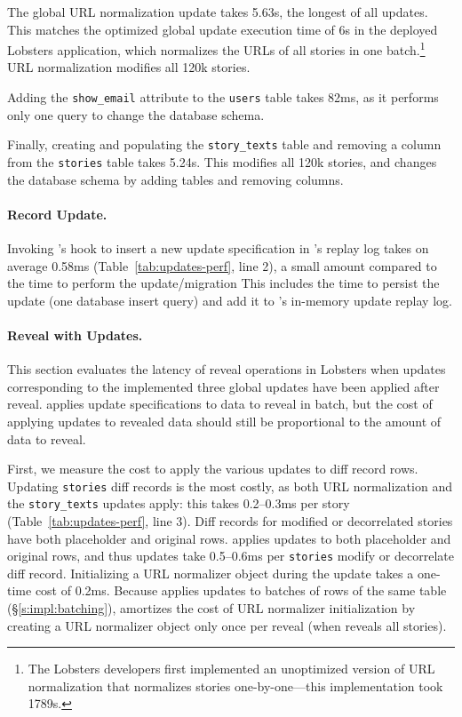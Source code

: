%
The global URL normalization update takes 5.63s, the longest of all
updates.
%
This matches the optimized global update execution time of 6s in the deployed
Lobsters application, which normalizes the URLs of all stories in one
batch.\footnote{The Lobsters developers first implemented an unoptimized version
of URL normalization that normalizes stories one-by-one---this implementation
took 1789s.}
%
URL normalization modifies all 120k stories.
%

%
Adding the \texttt{show\_email} attribute to the \texttt{users} table takes
82ms, as it performs only one query to change the database schema.
%

%
Finally, creating and populating the \texttt{story\_texts} table and removing a
column from the \texttt{stories} table takes 5.24s.
%
This modifies all 120k stories, and changes the database schema by adding tables
and removing columns.
%

%
\paragraph{Record Update.}
%
Invoking \sys's hook to insert a new update specification in \sys's replay log
takes on average 0.58ms (Table~\ref{tab:updates-perf}, line 2), a small 
amount compared to the time to perform the update/migration This includes the
time to persist the update (one database insert query) and add it to \sys's
in-memory update replay log.
%

%
\paragraph{Reveal with Updates.}
%
This section evaluates the latency of reveal operations in Lobsters when updates
corresponding to the implemented three global updates have been applied after
reveal. \sys applies update specifications to data to reveal in batch, but the cost of
applying updates to revealed data should still be proportional to the amount of
data to reveal.

First, we measure the cost to apply the various updates to diff record rows.
%
Updating \texttt{stories} diff records is the most costly, as both URL
normalization and the \texttt{story\_texts} updates apply: this takes 0.2--0.3ms
per story (Table~\ref{tab:updates-perf}, line 3).
%
Diff records for modified or decorrelated stories have both placeholder and
original rows. \sys applies updates to both placeholder and original rows, and
thus updates take 0.5--0.6ms per \texttt{stories} modify or decorrelate diff
record.
%
Initializing a URL normalizer object during the update takes a one-time cost of
0.2ms.
%
Because \sys applies updates to batches of rows of the same table
(\S\ref{s:impl:batching}), \sys amortizes the cost of URL normalizer
initialization by creating a URL normalizer object only once per reveal (when
\sys reveals all stories).
%

